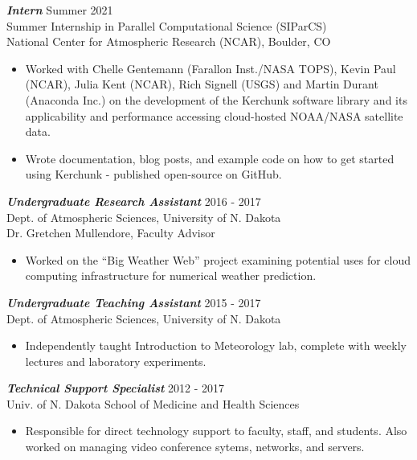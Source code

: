 \documentclass[overlapped]{res}
\begin{document}
\begin{resume}
                {\sl \textbf{Intern}} \hfill Summer 2021 \\
                Summer Internship in Parallel Computational Science (SIParCS) \\
                National Center for Atmospheric Research (NCAR), Boulder, CO \\
                \begin{itemize}
                    \item Worked with Chelle Gentemann (Farallon Inst./NASA TOPS), Kevin Paul (NCAR), Julia Kent (NCAR), Rich Signell (USGS) and Martin Durant (Anaconda Inc.) on the development of the Kerchunk software library and its applicability and performance accessing cloud-hosted NOAA/NASA satellite data.
                    \item Wrote documentation, blog posts, and example code on how to get started using Kerchunk - published open-source on GitHub.
                \end{itemize} 
                {\sl \textbf{Undergraduate Research Assistant}} \hfill 2016 - 2017 \\
                Dept. of Atmospheric Sciences, University of N. Dakota \\
                Dr. Gretchen Mullendore, Faculty Advisor \\
                \begin{itemize}\itemsep -2pt
                    \item Worked on the “Big Weather Web” project examining potential uses for cloud computing infrastructure for numerical weather prediction.
                \end{itemize}

                {\sl \textbf{Undergraduate Teaching Assistant}} \hfill 2015 - 2017 \\
                Dept. of Atmospheric Sciences, University of N. Dakota \\
                \begin{itemize}\itemsep -2pt
                    \item Independently taught Introduction to Meteorology lab, complete with weekly lectures and laboratory experiments.
                    
                \end{itemize}

                {\sl \textbf{Technical Support Specialist}} \hfill 2012 - 2017 \\
                Univ. of N. Dakota School of Medicine and Health Sciences \\
                \begin{itemize} \itemsep -2pt
                    \item Responsible  for  direct  technology  support  to  faculty,  staff,  and  students.  Also  worked  on managing video conference sytems, networks, and servers.


\end{itemize}
\end{resume}
\end{document}

